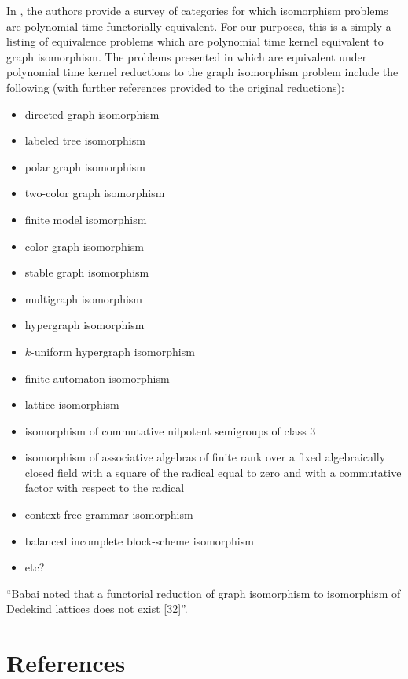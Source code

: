 \documentclass{article}
\theoremstyle{definition}
\begin{document}
In \cite{zkt85}, the authors provide a survey of categories for which
isomorphism problems are polynomial-time functorially equivalent. For our
purposes, this is a simply a listing of equivalence problems which are
polynomial time kernel equivalent to graph isomorphism. The problems presented
in \cite{zkt85} which are equivalent under polynomial time kernel reductions to
the graph isomorphism problem include the following (with further references
provided to the original reductions):
\begin{itemize}
\item directed graph isomorphism \cite{miller79}
\item labeled tree isomorphism \cite{babai79}
\item polar graph isomorphism \cite{zkt85}
\item two-color graph isomorphism \cite{zkt85}
\item finite model isomorphism \cite{miller79} %
\item color graph isomorphism \cite{zkt85} \cite{miller77} \cite{pultr64}
\item stable graph isomorphism \cite{wl68}
\item multigraph isomorphism \cite{zkt85} 
\item hypergraph isomorphism \cite{zkt85} 
\item $k$-uniform hypergraph isomorphism \cite{zkt85} \cite{hn70}
\item finite automaton isomorphism \cite{booth78}
\item lattice isomorphism %
\item isomorphism of commutative nilpotent semigroups of class 3 %
\item isomorphism of associative algebras of finite rank over a fixed
  algebraically closed field with a square of the radical equal to zero and
  with a commutative factor with respect to the radical %
\item context-free grammar isomorphism %
\item balanced incomplete block-scheme isomorphism %
\item etc? %




\end{itemize}

``Babai noted that a functorial reduction of graph isomorphism to isomorphism
of Dedekind lattices does not exist [32]''.

\section{References}
 
\end{document}
